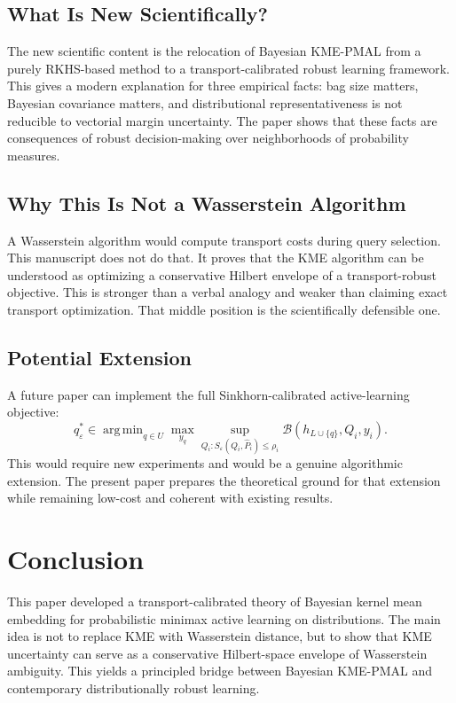 \documentclass[10pt,journal]{IEEEtran}
\DeclareMathOperator*{\argmin}{arg\,min}
\newcommand{\eps}{\varepsilon}
\newcommand{\wh}{\widehat}
\begin{document}
\subsection{What Is New Scientifically?}

The new scientific content is the relocation of Bayesian KME-PMAL from a purely RKHS-based method to a transport-calibrated robust learning framework. This gives a modern explanation for three empirical facts: bag size matters, Bayesian covariance matters, and distributional representativeness is not reducible to vectorial margin uncertainty. The paper shows that these facts are consequences of robust decision-making over neighborhoods of probability measures.

\subsection{Why This Is Not a Wasserstein Algorithm}

A Wasserstein algorithm would compute transport costs during query selection. This manuscript does not do that. It proves that the KME algorithm can be understood as optimizing a conservative Hilbert envelope of a transport-robust objective. This is stronger than a verbal analogy and weaker than claiming exact transport optimization. That middle position is the scientifically defensible one.

\subsection{Potential Extension}

A future paper can implement the full Sinkhorn-calibrated active-learning objective:
\begin{equation}
    q^*_{\eps}\in\argmin_{q\in U}\max_{y_q}\sup_{Q_i:S_\eps(Q_i,\wh P_i)\le \rho_i}\mathcal{B}(h_{L\cup\{q\}},Q_i,y_i).
\end{equation}
This would require new experiments and would be a genuine algorithmic extension. The present paper prepares the theoretical ground for that extension while remaining low-cost and coherent with existing results.

\section{Conclusion}
\label{sec:conclusion}

This paper developed a transport-calibrated theory of Bayesian kernel mean embedding for probabilistic minimax active learning on distributions. The main idea is not to replace KME with Wasserstein distance, but to show that KME uncertainty can serve as a conservative Hilbert-space envelope of Wasserstein ambiguity. This yields a principled bridge between Bayesian KME-PMAL and contemporary distributionally robust learning.
\end{document}
